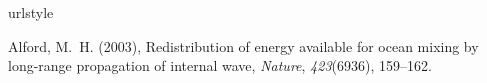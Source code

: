 \documentclass[grl]{agutex2015}
\begin{document}
\begin{article}

%







%
%
%
%
%
%


%
\begin{thebibliography}{18}
\providecommand{\natexlab}[1]{#1}
\expandafter\ifx\csname urlstyle\endcsname\relax
  \providecommand{\doi}[1]{doi:\discretionary{}{}{}#1}\else
  \providecommand{\doi}{doi:\discretionary{}{}{}\begingroup
  \urlstyle{rm}\Url}\fi

Alford, M.~H. (2003), {Redistribution of energy available for ocean mixing by
  long-range propagation of internal wave}, \textit{Nature},
  \textit{423}(6936), 159--162.


\end{thebibliography}
\end{article}
\end{document}
